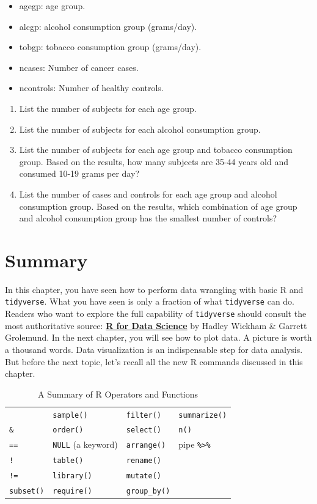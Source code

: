 \documentclass[
  letterpaper,
  DIV=11,
  numbers=noendperiod]{scrreprt}
\begin{document}
\begin{itemize}
\item
  agegp: age group.
\item
  alcgp: alcohol consumption group (grams/day).
\item
  tobgp: tobacco consumption group (grams/day).
\item
  ncases: Number of cancer cases.
\item
  ncontrols: Number of healthy controls.
\end{itemize}

\begin{enumerate}
\def\labelenumi{\alph{enumi}.}
\item
  List the number of subjects for each age group.
\item
  List the number of subjects for each alcohol consumption group.
\item
  List the number of subjects for each age group and tobacco consumption
  group. Based on the results, how many subjects are 35-44 years old and
  consumed 10-19 grams per day?
\item
  List the number of cases and controls for each age group and alcohol
  consumption group. Based on the results, which combination of age
  group and alcohol consumption group has the smallest number of
  controls?
\end{enumerate}

\section{Summary}\label{summary-1}

In this chapter, you have seen how to perform data wrangling with basic
R and \texttt{tidyverse}. What you have seen is only a fraction of what
\texttt{tidyverse} can do. Readers who want to explore the full
capability of \texttt{tidyverse} should consult the most authoritative
source: \href{https://r4ds.had.co.nz/}{\textbf{R for Data Science}} by
Hadley Wickham \& Garrett Grolemund. In the next chapter, you will see
how to plot data. A picture is worth a thousand words. Data
visualization is an indispensable step for data analysis. But before the
next topic, let's recall all the new R commands discussed in this
chapter.

\begin{longtable}[]{@{}llll@{}}
\caption{A Summary of R Operators and Functions}\tabularnewline
\toprule\noalign{}
\endfirsthead
\endhead
\bottomrule\noalign{}
\endlastfoot
\textbar{} & \texttt{sample()} & \texttt{filter()} &
\texttt{summarize()} \\
\texttt{\&} & \texttt{order()} & \texttt{select()} & \texttt{n()} \\
\texttt{==} & \texttt{NULL} (a keyword) & \texttt{arrange()} & pipe
\texttt{\%\textgreater{}\%} \\
\texttt{!} & \texttt{table()} & \texttt{rename()} & \\
\texttt{!=} & \texttt{library()} & \texttt{mutate()} & \\
\texttt{subset()} & \texttt{require()} & \texttt{group\_by()} & \\
\end{longtable}
\end{document}
